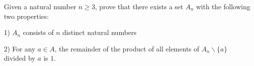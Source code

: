 Given a natural number $n\ge 3$, prove that there exists a set $A_n$ with the following two properties:

1) $A_n $ consists of $n$ distinct natural numbers

2) For any $a\in A$, the remainder of the product of all elements of $A_n\backslash \{a\}$ divided by $a$ is $1$.
